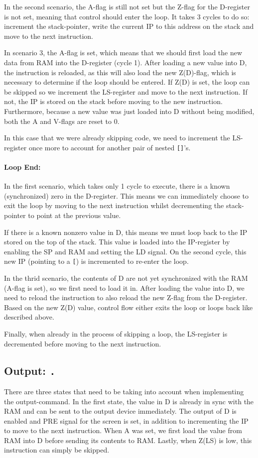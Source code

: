 In the second scenario, the A-flag is still not set but the Z-flag for the D-register is not set, meaning that control should enter the loop. It takes 3 cycles to do so: increment the stack-pointer, write the current IP to this address on the stack and move to the next instruction.

In scenario 3, the A-flag is set, which means that we should first load the new data from RAM into the D-register (cycle 1). After loading a new value into D, the instruction is reloaded, as this will also load the new Z(D)-flag, which is necessary to determine if the loop should be entered. If Z(D) is set, the loop can be skipped so we increment the LS-register and move to the next instruction. If not, the IP is stored on the stack before moving to the new instruction. Furthermore, because a new value was just loaded into D without being modified, both the A and V-flags are reset to 0.

In this case that we were already skipping code, we need to increment the LS-register once more to account for another pair of nested \texttt{[]}'s.

\paragraph{Loop End:}
In the first scenario, which takes only 1 cycle to execute, there is a known (synchronized) zero in the D-register. This means we can immediately choose to exit the loop by moving to the next instruction whilst decrementing the stack-pointer to point at the previous value.

If there is a known nonzero value in D, this means we must loop back to the IP stored on the top of the stack. This value is loaded into the IP-register by enabling the SP and RAM and setting the LD signal. On the second cycle, this new IP (pointing to a \texttt{[}) is incremented to re-enter the loop.

In the thrid scenario, the contents of D are not yet synchronized with the RAM (A-flag is set), so we first need to load it in. After loading the value into D, we need to reload the instruction to also reload the new Z-flag from the D-register. Based on the new Z(D) value, control flow either exits the loop or loops back like described above.

Finally, when already in the process of skipping a loop, the LS-register is decremented before moving to the next instruction.

\subsection{Output: \texttt{.}}
There are three states that need to be taking into account when implementing the output-command. In the first state, the value in D is already in sync with the RAM and can be sent to the output device immediately. The output of D is enabled and PRE signal for the screen is set, in addition to incrementing the IP to move to the next instruction. When A was set, we first load the value from RAM into D before sending its contents to RAM. Lastly, when Z(LS) is low, this instruction can simply be skipped.

